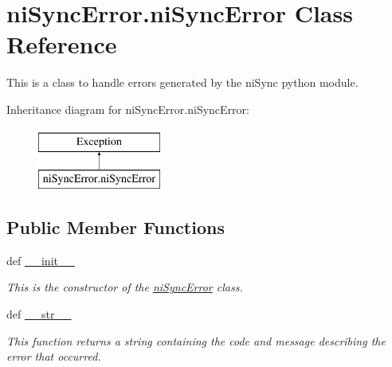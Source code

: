 \hypertarget{classni_sync_error_1_1ni_sync_error}{\section{ni\-Sync\-Error.\-ni\-Sync\-Error Class Reference}
\label{classni_sync_error_1_1ni_sync_error}
}


This is a class to handle errors generated by the ni\-Sync python module.  


Inheritance diagram for ni\-Sync\-Error.\-ni\-Sync\-Error\-:\begin{figure}[H]
\begin{center}
\leavevmode
\includegraphics[height=2.000000cm]{classni_sync_error_1_1ni_sync_error}
\end{center}
\end{figure}
\subsection*{Public Member Functions}
\begin{DoxyCompactItemize}
\item 
def \hyperlink{classni_sync_error_1_1ni_sync_error_ac36e2cdbeddc5112ee22e659c15b6fd8}{\-\_\-\-\_\-init\-\_\-\-\_\-}
\begin{DoxyCompactList}\small\item\em This is the constructor of the \hyperlink{classni_sync_error_1_1ni_sync_error}{ni\-Sync\-Error} class. \end{DoxyCompactList}\item 
def \hyperlink{classni_sync_error_1_1ni_sync_error_a1b30d4c0ff582d4f449f1ee140a5c3d0}{\-\_\-\-\_\-str\-\_\-\-\_\-}
\begin{DoxyCompactList}\small\item\em This function returns a string containing the code and message describing the error that occurred. \end{DoxyCompactList}\end{DoxyCompactItemize}
